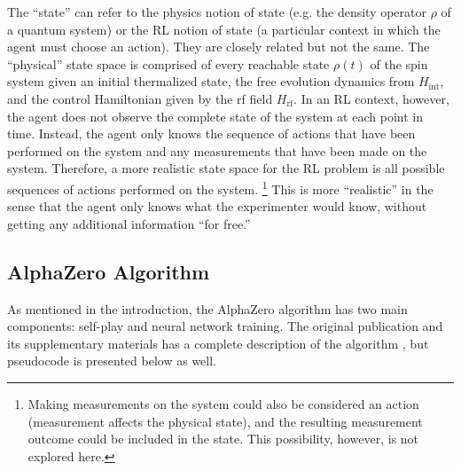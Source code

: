The ``state'' can refer to the physics notion of state (e.g. the density operator $\rho$ of a quantum system) or the RL notion of state (a particular context in which the agent must choose an action). They are closely related but not the same.
The ``physical'' state space is comprised of every reachable state $\rho(t)$ of the spin system given an initial thermalized state, the free evolution dynamics from $H_{\text{int}}$, and the control Hamiltonian given by the rf field $H_{\text{rf}}$.
In an RL context, however, the agent does not observe the complete state of the system at each point in time. Instead, the agent only knows the sequence of actions that have been performed on the system and any measurements that have been made on the system.
Therefore, a more realistic state space for the RL problem is all possible sequences of actions performed on the system.%
\footnote{
Making measurements on the system could also be considered an action (measurement affects the physical state), and the resulting measurement outcome could be included in the state. This possibility, however, is not explored here.
}
This is more ``realistic'' in the sense that the agent only knows what the experimenter would know, without getting any additional information ``for free.''

%


\subsection{AlphaZero Algorithm}

As mentioned in the introduction, the AlphaZero algorithm has two main components: self-play and neural network training. The original publication and its supplementary materials has a complete description of the algorithm \cite{Silver1140}, but pseudocode is presented below as well.

